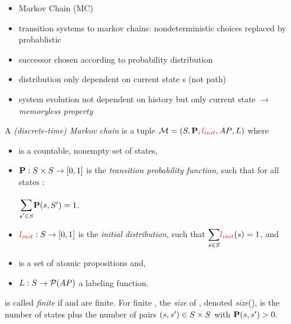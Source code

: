 \documentclass[preview]{standalone}
\begin{document}
\begin{itemize}
	\item Markov Chain (MC)
	\item transition systems to markov chains: nondeterministic choices replaced by probablistic
	\item successor chosen according to probability distribution
	\item distribution only dependent on current state s (not path)
	\item system evolution not dependent on history but only current state $\to$ \emph{memoryless property}
\end{itemize}


\begin{definition}
	A \emph{(discrete-time) Markov chain} is a tuple ${\mathcal{M}} = ({S}, {\textbf{P}}, {\color{red}{l_{init}}}, {AP}, {L})$ where 
	\begin{itemize}
		\item \states is a countable, nonempty set of states,
		\item ${\textbf{P}} : {S} \times {S} \to [0,1]$ is the \emph{transition probability function}, such that for all states \state:
		\begin{center}
			$\bbigsum{\state' \in \states}\probtfunc(\state,\states') = 1$.	
		\end{center}
		\item ${\color{red}{l_{init}}} : {S} \to [0,1]$ is the \emph{initial distribution}, such that $\mathlarger{\sum_{\state \in \states}} \initdist(\state) = 1$, and
		\item \atomicprops is a set of atomic propositions and,
		\item ${L} : {S} \to {\mathcal{P}(\ensuremath{{AP}})}$ a labeling function.		
	\end{itemize}

	\autm is called \emph{finite} if \states and \atomicprops are finite. For finite \autm, the \emph{size} of \autm, denoted \emph{size}(\autm),  is the number of states plus the number of pairs $({s}, {s}') \in {S} \times {S}$ with ${\textbf{P}}({s}, {s}') > 0.$
\end{definition}
\end{document}
